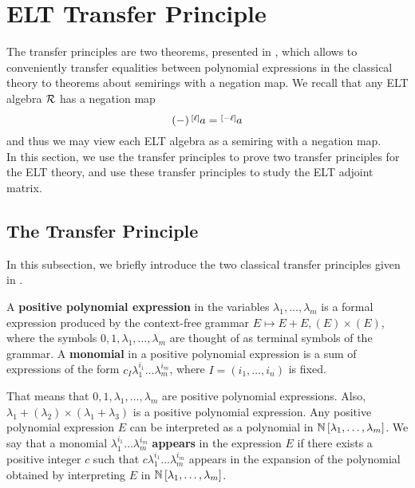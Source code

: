 \section{ELT Transfer Principle}

The transfer principles are two theorems, presented in \cite{Akian2008}, which allows to conveniently transfer equalities between polynomial expressions in the classical theory to theorems about semirings with a negation map. We recall that any ELT algebra $\R$ has a negation map
$$\left(-\right)\layer{a}{\ell}=\layer{a}{-\ell}$$
and thus we may view each ELT algebra as a semiring with a negation map.\\

In this section, we use the transfer principles to prove two transfer principles for the ELT theory, and use these transfer principles to study the ELT adjoint matrix.

\subsection{The Transfer Principle}

In this subsection, we briefly introduce the two classical transfer principles given in \cite{Akian2008}.

\begin{defn}
A \textbf{positive polynomial expression} in the variables $\lambda_1,\dots,\lambda_m$ is a formal expression produced by the context-free grammar $E\mapsto E+E,\left(E\right)\times\left(E\right)$, where the symbols $0,1,\lambda_1,\dots,\lambda_m$ are thought of as terminal symbols of the grammar. A \textbf{monomial} in a positive polynomial expression is a sum of expressions of the form $c_I\lambda_1^{i_1}\dots \lambda_m^{i_m}$, where $I=\left(i_1,\dots,i_n\right)$ is fixed.
\end{defn}

That means that $0,1,\lambda_1,\dots,\lambda_m$ are positive polynomial expressions. Also, $\lambda_1+\left(\lambda_2\right)\times\left(\lambda_1+\lambda_3\right)$ is a positive polynomial expression. Any positive polynomial expression $E$ can be interpreted as a polynomial in $\N\left[\lambda_1,\dots,\lambda_m\right]$. We say that a monomial $\lambda_1^{i_1}\dots \lambda_m^{i_m}$ \textbf{appears} in the expression $E$ if there exists a positive integer $c$ such that $c\lambda_1^{i_1}\dots \lambda_m^{i_m}$ appears in the expansion of the polynomial obtained by interpreting $E$ in $\N\left[\lambda_1,\dots,\lambda_m\right]$.

